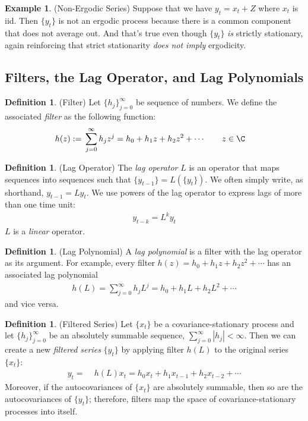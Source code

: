 \documentclass[12pt]{article}
\theoremstyle{plain}
\theoremstyle{definition}
\newtheorem{defn}[thm]{Definition}
\newtheorem{ex}[thm]{Example}
\theoremstyle{remark}
\begin{document}
\begin{ex}(Non-Ergodic Series)
Suppose that we have $y_t=x_t+Z$ where $x_t$ is iid. Then $\{y_t\}$ is
not an ergodic process because there is a common component that does not
average out. And that's true even though $\{y_t\}$ \emph{is} strictly
stationary, again reinforcing that strict stationarity
\emph{does not imply} ergodicity.
\end{ex}


\clearpage
\subsection{Filters, the Lag Operator, and Lag Polynomials}

\begin{defn}(Filter)
Let $\{h_j\}_{j=0}^\infty$ be sequence of numbers.
We define the associated \emph{filter} as the following function:
\begin{align*}
  h(z) :=&\; \sum_{j=0}^\infty h_j z^j
  = h_0 + h_1 z + h_2 z^2 + \cdots
  \qquad z\in\C
\end{align*}
\end{defn}

\begin{defn}(Lag Operator)
The \emph{lag operator} $L$ is an operator that maps sequences
into sequences such that $\{y_{t-1}\}=L\left(\{y_t\}\right)$. We often
simply write, as shorthand, $y_{t-1}=Ly_t$. We use powers of the lag
operator to express lags of more than one time unit:
\begin{align*}
  y_{t-k} = L^k y_t
\end{align*}
$L$ is a \emph{linear} operator.
\end{defn}

\begin{defn}(Lag Polynomial)
A \emph{lag polynomial} is a filter with the lag operator as its
argument. For example, every filter $h(z)=h_0+h_1z + h_2z^2+\cdots$ has
an associated lag polynomial
\begin{align*}
  h(L) = \sum_{j=0}^\infty h_j L^j = h_0 + h_1L + h_2 L^2 + \cdots
\end{align*}
and vice versa.
\end{defn}

\begin{defn}(Filtered Series)
Let $\{x_t\}$ be a covariance-stationary process and let
$\{h_j\}_{j=0}^\infty$ be an absolutely summable sequence,
$\sum_{j=0}^\infty |h_j|<\infty$.
Then we can create a new \emph{filtered series} $\{y_t\}$ by applying
filter $h(L)$ to the original series $\{x_t\}$:
\begin{align*}
  y_t =&\; h(L)x_t
  = h_0 x_t + h_1x_{t-1} + h_2x_{t-2} + \cdots
\end{align*}
Moreover, if the autocovariances of $\{x_t\}$ are absolutely summable,
then so are the autocovariances of $\{y_t\}$; therefore, filters map the
space of covariance-stationary processes into itself.
\end{defn}
\end{document}
